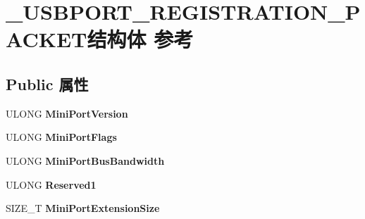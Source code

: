 \hypertarget{struct___u_s_b_p_o_r_t___r_e_g_i_s_t_r_a_t_i_o_n___p_a_c_k_e_t}{}\section{\+\_\+\+U\+S\+B\+P\+O\+R\+T\+\_\+\+R\+E\+G\+I\+S\+T\+R\+A\+T\+I\+O\+N\+\_\+\+P\+A\+C\+K\+E\+T结构体 参考}
\label{struct___u_s_b_p_o_r_t___r_e_g_i_s_t_r_a_t_i_o_n___p_a_c_k_e_t}
\subsection*{Public 属性}
\begin{DoxyCompactItemize}
\item 
\mbox{\label{struct___u_s_b_p_o_r_t___r_e_g_i_s_t_r_a_t_i_o_n___p_a_c_k_e_t_a58a64dc38bb5e1fe17dd569cee397b50}} 
U\+L\+O\+NG {\bfseries Mini\+Port\+Version}
\item 
\mbox{\label{struct___u_s_b_p_o_r_t___r_e_g_i_s_t_r_a_t_i_o_n___p_a_c_k_e_t_acc3d4f439554cfbdfb32af77c731e704}} 
U\+L\+O\+NG {\bfseries Mini\+Port\+Flags}
\item 
\mbox{\label{struct___u_s_b_p_o_r_t___r_e_g_i_s_t_r_a_t_i_o_n___p_a_c_k_e_t_abdbfd9c052c2e6b03d4f097a31c60db6}} 
U\+L\+O\+NG {\bfseries Mini\+Port\+Bus\+Bandwidth}
\item 
\mbox{\label{struct___u_s_b_p_o_r_t___r_e_g_i_s_t_r_a_t_i_o_n___p_a_c_k_e_t_a00ef3dd0e708051f0ec9ba9187c7332c}} 
U\+L\+O\+NG {\bfseries Reserved1}
\item 
\mbox{\label{struct___u_s_b_p_o_r_t___r_e_g_i_s_t_r_a_t_i_o_n___p_a_c_k_e_t_a7d936bb82f08387cd8aff747ac52a531}} 
S\+I\+Z\+E\+\_\+T {\bfseries Mini\+Port\+Extension\+Size}
\item 
\mbox{\label{struct___u_s_b_p_o_r_t___r_e_g_i_s_t_r_a_t_i_o_n___p_a_c_k_e_t_a4667c7d41036828050112e341a27b647}} 

\end{DoxyCompactItemize}
